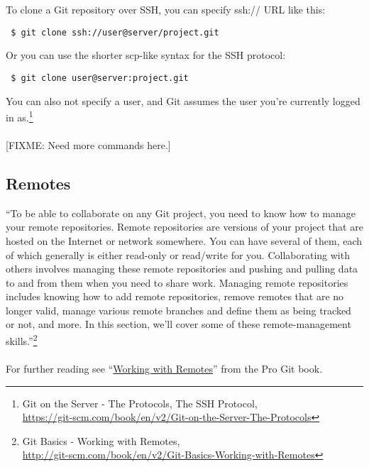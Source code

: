 \documentclass[12pt,letterpaper,dvips]{article}
\newcommand{\FIXME}[1]{\textsf{[FIXME: #1]}}
\begin{document}
\newpage
\noindent To clone a Git repository over SSH, you can specify ssh:// URL like this:\\
\begin{Verbatim}
 $ git clone ssh://user@server/project.git
\end{Verbatim}

\noindent Or you can use the shorter scp-like syntax for the SSH protocol:

\begin{Verbatim}
 $ git clone user@server:project.git
\end{Verbatim}

\noindent You can also not specify a user, and Git assumes the user
you're currently logged in as.\footnote{
Git on the Server - The Protocols, The SSH Protocol,\\
\href{https://git-scm.com/book/en/v2/Git-on-the-Server-The-Protocols}{https://git-scm.com/book/en/v2/Git-on-the-Server-The-Protocols}}
\\
\\
\noindent \FIXME{Need more commands here.}


\subsection{Remotes}
``To be able to collaborate on any Git project, you need to know
how to manage your remote repositories.  Remote repositories are
versions of your project that are hosted on the Internet or
network somewhere.  You can have several of them, each of which
generally is either read-only or read/write for you.
Collaborating with others involves managing these remote
repositories and pushing and pulling data to and from them when
you need to share work.  Managing remote repositories includes
knowing how to add remote repositories, remove remotes that are no
longer valid, manage various remote branches and define them as
being tracked or not, and more. In this section, we’ll cover some
of these remote-management skills.''\footnote{Git Basics - Working
with Remotes,\\
\href{http://git-scm.com/book/en/v2/Git-Basics-Working-with-Remotes}{http://git-scm.com/book/en/v2/Git-Basics-Working-with-Remotes}}
\\
\\
\noindent For further reading see ``\href{http://git-scm.com/book/en/Git-Basics-Working-with-Remotes}{Working with Remotes}''
from the Pro Git book.
\end{document}
